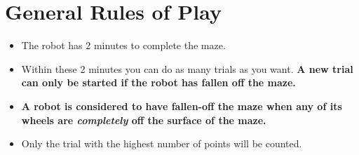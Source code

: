 \documentclass[a4paper,12pt]{article}
\begin{document}
\section{General Rules of Play}
\begin{itemize}
\item The robot has 2 minutes to complete the maze.
\item Within these 2 minutes you can do as many trials as you want. 
\textbf{A new trial can only be started if the robot has fallen off the maze.}
\item \textbf{A robot is considered to have fallen-off the maze when any of its wheels are
\emph{completely} off the surface of the maze.}
\item Only the trial with the
highest number of points will be counted.
\end{itemize}
\end{document}
